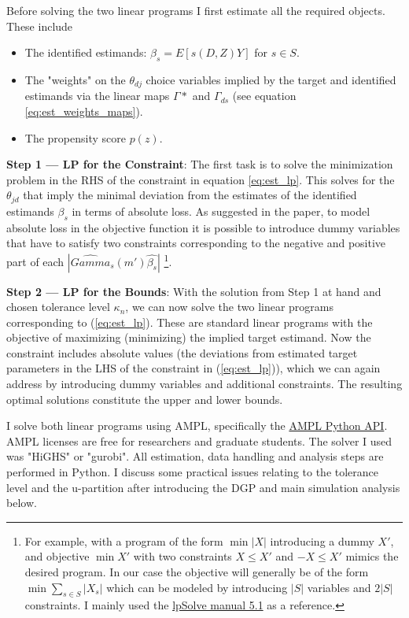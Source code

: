 \documentclass[11pt, a4paper, leqno]{article}
\begin{document}
Before solving the two linear programs I first estimate all the required objects. These include
\begin{itemize}
    \item The identified estimands: $\beta_s = E[s(D,Z)Y]$ for $s\in S$.
    \item The "weights" on the $\theta_{dj}$ choice variables implied by the target and identified estimands via the linear maps $\Gamma*$ and $\Gamma_{ds}$ (see equation \ref{eq:est_weights_maps}).
    \item The propensity score $p(z)$.
\end{itemize}

\textbf{Step 1 --- LP for the Constraint}: The first task is to solve the minimization problem in the RHS of the constraint in equation \ref{eq:est_lp}.
This solves for the $\theta_{jd}$ that imply the minimal deviation from the estimates of the identified estimands $\beta_s$ in terms of absolute loss.
As suggested in the paper, to model absolute loss in the objective function it is possible to introduce dummy variables that have to satisfy two constraints corresponding to the negative and positive part of each $|\hat{Gamma}_s(m')\hat{\beta_s}|$
\footnote{For example, with a program of the form $\min |X|$ introducing a dummy $X'$, and objective $\min X'$ with two constraints $X\leq X'$ and $-X\leq X'$ mimics the desired program.
In our case the objective will generally be of the form $\min\sum_{s\in S}|X_s|$ which can be modeled by introducing $|S|$ variables and $2|S|$ constraints. I mainly used the \href{https://lpsolve.sourceforge.net/5.1/absolute.htm}{lpSolve manual 5.1} as a reference.}.

\textbf{Step 2 --- LP for the Bounds}: With the solution from Step 1 at hand and chosen tolerance level $\kappa_n$, we can now solve the two linear programs corresponding to (\ref{eq:est_lp}).
These are standard linear programs with the objective of maximizing (minimizing) the implied target estimand. Now the constraint includes absolute values (the deviations from estimated target parameters in the LHS of the constraint in (\ref{eq:est_lp})), which we can again address by introducing dummy variables and additional constraints.
The resulting optimal solutions constitute the upper and lower bounds.

I solve both linear programs using AMPL, specifically the \href{https://amplpy.readthedocs.io/en/latest/}{AMPL Python API}. AMPL licenses are free for researchers and graduate students.
The solver I used was "HiGHS" or "gurobi". All estimation, data handling and analysis steps are performed in Python.
I discuss some practical issues relating to the tolerance level and the u-partition after introducing the DGP and main simulation analysis below.
\end{document}
